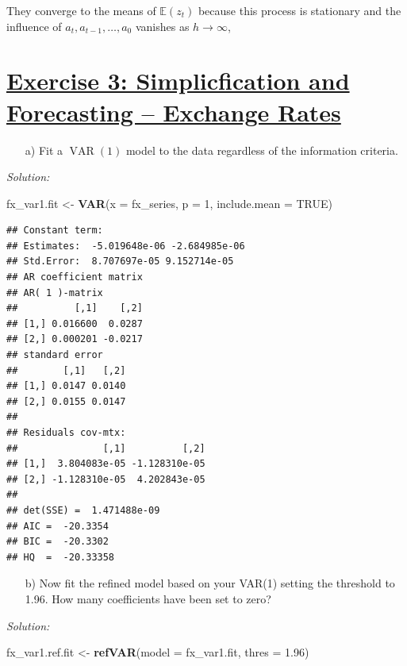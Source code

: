 \documentclass[12pt,a4paper]{article}
\newcommand{\VAR}{\operatorname{VAR}} %
\newcommand{\tmpsection}[1]{}
\let\tmpsection=\section
\renewcommand{\section}[1]{\tmpsection{\underline{#1}} }
\newenvironment{Shaded}{\begin{snugshade}}{\end{snugshade}}
\newcommand{\DataTypeTok}[1]{\textcolor[rgb]{0.13,0.29,0.53}{#1}}
\newcommand{\DecValTok}[1]{\textcolor[rgb]{0.00,0.00,0.81}{#1}}
\newcommand{\FloatTok}[1]{\textcolor[rgb]{0.00,0.00,0.81}{#1}}
\newcommand{\KeywordTok}[1]{\textcolor[rgb]{0.13,0.29,0.53}{\textbf{#1}}}
\newcommand{\NormalTok}[1]{#1}
\newcommand{\OtherTok}[1]{\textcolor[rgb]{0.56,0.35,0.01}{#1}}
\newcommand{\StringTok}[1]{\textcolor[rgb]{0.31,0.60,0.02}{#1}}
\begin{document}
They converge to the means of \(\mathbb{E}(z_t)\) because this process
is stationary and the influence of \(a_t, a_{t-1}, \ldots, a_{0}\)
vanishes as \(h \rightarrow \infty\),

\hypertarget{exercise-3-simplicfication-and-forecasting-exchange-rates}{%
\section{Exercise 3: Simplicfication and Forecasting -- Exchange
Rates}\label{exercise-3-simplicfication-and-forecasting-exchange-rates}}

\begin{itemize}
  \item[a)] Fit a $\VAR(1)$ model to the data regardless of the information criteria.
\end{itemize}

\emph{Solution:}

\begin{Shaded}
\begin{Highlighting}[]
\NormalTok{fx_var1.fit <-}\StringTok{ }\KeywordTok{VAR}\NormalTok{(}\DataTypeTok{x =}\NormalTok{ fx_series, }\DataTypeTok{p =} \DecValTok{1}\NormalTok{, }\DataTypeTok{include.mean =} \OtherTok{TRUE}\NormalTok{)}
\end{Highlighting}
\end{Shaded}

\begin{verbatim}
## Constant term: 
## Estimates:  -5.019648e-06 -2.684985e-06 
## Std.Error:  8.707697e-05 9.152714e-05 
## AR coefficient matrix 
## AR( 1 )-matrix 
##          [,1]    [,2]
## [1,] 0.016600  0.0287
## [2,] 0.000201 -0.0217
## standard error 
##        [,1]   [,2]
## [1,] 0.0147 0.0140
## [2,] 0.0155 0.0147
##   
## Residuals cov-mtx: 
##               [,1]          [,2]
## [1,]  3.804083e-05 -1.128310e-05
## [2,] -1.128310e-05  4.202843e-05
##   
## det(SSE) =  1.471488e-09 
## AIC =  -20.3354 
## BIC =  -20.3302 
## HQ  =  -20.33358
\end{verbatim}

\begin{itemize}
  \item[b)] Now fit the refined model based on your VAR(1) setting the threshold to 1.96. How many coefficients have been set to zero?
\end{itemize}

\emph{Solution:}

\begin{Shaded}
\begin{Highlighting}[]
\NormalTok{fx_var1.ref.fit <-}\StringTok{ }\KeywordTok{refVAR}\NormalTok{(}\DataTypeTok{model =}\NormalTok{ fx_var1.fit, }\DataTypeTok{thres =} \FloatTok{1.96}\NormalTok{)}
\end{Highlighting}
\end{Shaded}
\end{document}
